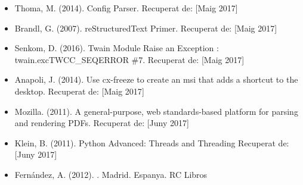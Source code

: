 \documentclass[letterpaper,11pt,catalan]{sphinxmanual}
\begin{document}
\begin{itemize}
\item {} 
Thoma, M. (2014). Config Parser.  Recuperat de:  {[}Maig 2017{]}

\item {} 
Brandl, G. (2007). reStructuredText Primer.  Recuperat de:  {[}Maig 2017{]}

\item {} 
Senkom, D. (2016). Twain Module Raise an Exception : twain.excTWCC\_SEQERROR \#7.  Recuperat de:  {[}Maig 2017{]}

\item {} 
Anapoli, J. (2014). Use cx-freeze to create an msi that adds a shortcut to the desktop.  Recuperat de:  {[}Maig 2017{]}

\item {} 
Mozilla. (2011). A general-purpose, web standards-based platform for parsing and rendering PDFs.  Recuperat de:  {[}Juny 2017{]}

\item {} 
Klein, B. (2011). Python Advanced: Threads and Threading  Recuperat de:  {[}Juny 2017{]}

\item {} 
Fernández, A. (2012). . Madrid. Espanya. RC Libros

\end{itemize}



\renewcommand{\indexname}{Índex}
\printindex
\end{document}
